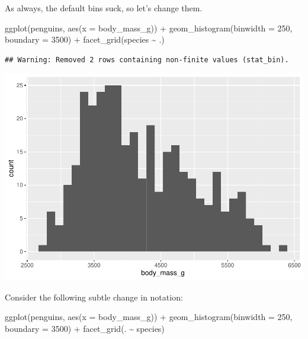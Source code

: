 \documentclass[
]{book}
\newenvironment{Shaded}{\begin{snugshade}}{\end{snugshade}}
\newcommand{\AttributeTok}[1]{\textcolor[rgb]{0.77,0.63,0.00}{#1}}
\newcommand{\DecValTok}[1]{\textcolor[rgb]{0.00,0.00,0.81}{#1}}
\newcommand{\FunctionTok}[1]{\textcolor[rgb]{0.00,0.00,0.00}{#1}}
\newcommand{\NormalTok}[1]{#1}
\newcommand{\SpecialCharTok}[1]{\textcolor[rgb]{0.00,0.00,0.00}{#1}}
\begin{document}
As always, the default bins suck, so let's change them.

\begin{Shaded}
\begin{Highlighting}[]
\FunctionTok{ggplot}\NormalTok{(penguins, }\FunctionTok{aes}\NormalTok{(}\AttributeTok{x =}\NormalTok{ body\_mass\_g)) }\SpecialCharTok{+}
    \FunctionTok{geom\_histogram}\NormalTok{(}\AttributeTok{binwidth =} \DecValTok{250}\NormalTok{, }\AttributeTok{boundary =} \DecValTok{3500}\NormalTok{) }\SpecialCharTok{+}
    \FunctionTok{facet\_grid}\NormalTok{(species }\SpecialCharTok{\textasciitilde{}}\NormalTok{ .)}
\end{Highlighting}
\end{Shaded}

\begin{verbatim}
## Warning: Removed 2 rows containing non-finite values (stat_bin).
\end{verbatim}

\includegraphics{intro_stats_files/figure-latex/unnamed-chunk-107-1.pdf}

Consider the following subtle change in notation:

\begin{Shaded}
\begin{Highlighting}[]
\FunctionTok{ggplot}\NormalTok{(penguins, }\FunctionTok{aes}\NormalTok{(}\AttributeTok{x =}\NormalTok{ body\_mass\_g)) }\SpecialCharTok{+}
    \FunctionTok{geom\_histogram}\NormalTok{(}\AttributeTok{binwidth =} \DecValTok{250}\NormalTok{, }\AttributeTok{boundary =} \DecValTok{3500}\NormalTok{) }\SpecialCharTok{+}
    \FunctionTok{facet\_grid}\NormalTok{(. }\SpecialCharTok{\textasciitilde{}}\NormalTok{ species)}
\end{Highlighting}
\end{Shaded}
\end{document}
